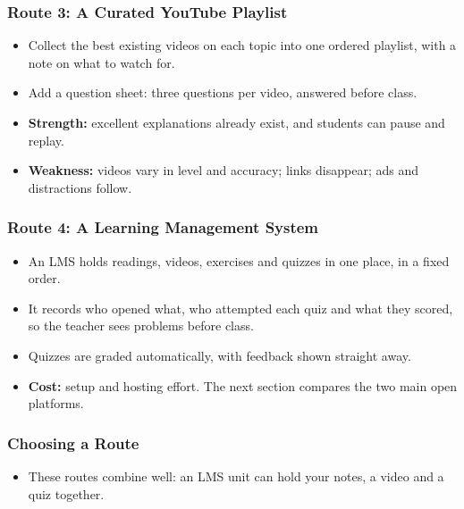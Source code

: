 \begin{frame}[fragile]\frametitle{Route 3: A Curated YouTube Playlist}
\begin{itemize}
\item Collect the best existing videos on each topic into one ordered playlist, with a note on what to watch for.
\item Add a question sheet: three questions per video, answered before class.
\item \textbf{Strength:} excellent explanations already exist, and students can pause and replay.
\item \textbf{Weakness:} videos vary in level and accuracy; links disappear; ads and distractions follow.
\end{itemize}
\end{frame}

\begin{frame}[fragile]\frametitle{Route 4: A Learning Management System}
\begin{itemize}
\item An LMS holds readings, videos, exercises and quizzes in one place, in a fixed order.
\item It records who opened what, who attempted each quiz and what they scored, so the teacher sees problems before class.
\item Quizzes are graded automatically, with feedback shown straight away.
\item \textbf{Cost:} setup and hosting effort. The next section compares the two main open platforms.
\end{itemize}
\end{frame}

\begin{frame}[fragile]\frametitle{Choosing a Route}
\begin{center}
\end{center}
\begin{itemize}
\item These routes combine well: an LMS unit can hold your notes, a video and a quiz together.
\end{itemize}
\end{frame}

